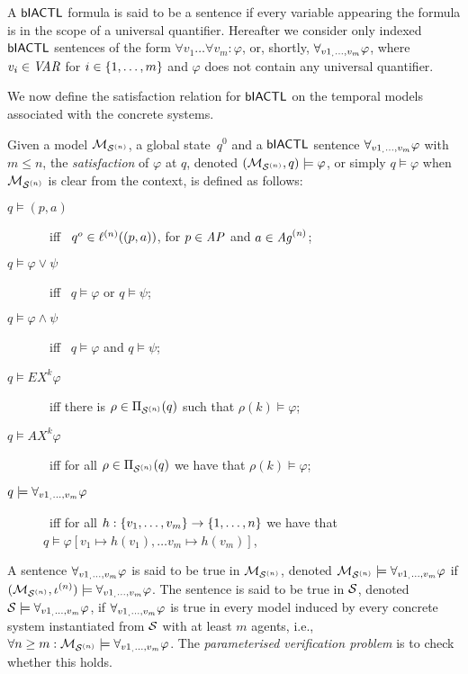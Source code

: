 A $\sf{bIACTL}$ formula is said to be a sentence if every variable appearing the
formula is in the scope of a universal quantifier. Hereafter we consider only
indexed $\sf{bIACTL}$ sentences of the form $\forall v_1 \ldots \forall v_m :
\varphi$, or, shortly, $\forall_{v1_,\ldots,v_m} \varphi$, where $v_i \in \it{VAR}$ for $i \in
\left \{ 1,\ldots,m \right \}$ and $\varphi$ does not contain any universal quantifier.

We now define the satisfaction relation for $\sf{bIACTL}$ on the temporal models
associated with the concrete systems.

\begin{definition}[Satisfaction]
  \label{def:sat} 
  Given a model $\mathcal{M}_{\mathcal{S}^{(n)}}$, a global state~$q^0$ and a $\sf{bIACTL}$ sentence
  $\forall_{v1_,\ldots,v_m} \varphi$ with $m \leq n$, the \emph{satisfaction} of $\varphi$ at $q$, denoted $(\mathcal{M}_{\mathcal{S}^{(n)}}, q)
  \models\varphi$, or simply $q \models \varphi$ when $\mathcal{M}_{\mathcal{S}^{(n)}}$ is clear from
  the context, is defined as follows:
  \begin{description}
  \item[$q \models (p, a)$] \ iff \ $q^o \in \ell^{(n)}((p, a))$, for $p \in
  \it{AP}$ and $a \in \it{Ag}^{(n)}$; 
  \item[$q \models \varphi \lor \psi$] \ iff \ $q \models \varphi$ or $q \models
  \psi$;
  \item[$q \models \varphi \land \psi$] \ iff \ $q \models \varphi$ and $q
  \models \psi$;
  \item[$q \models EX^k  \varphi$] \ iff  there is $\rho \in \Pi_{\mathcal{S}^{(n)}}(q)$ such
  that $\rho(k) \models \varphi$;
  \item[$q \models AX^k  \varphi$] \ iff for all $\rho \in \Pi_{\mathcal{S}^{(n)}}(q)$ we
  have that $\rho(k) \models \varphi$;
  \item[$q \models \forall_{v1_,\ldots,v_m} \varphi$] \ iff for all $h : \left \{ v_1, \ldots, v_m \right \}
  \rightarrow \left \{ {1}, \ldots,{n} \right \}$ we have that $q \models 
  \varphi[v_1 \mapsto h(v_1), \ldots v_m \mapsto h(v_m)]$,
 \end{description}
\end{definition}

A sentence $\forall_{v1_,\ldots,v_m} \varphi$ is said to be true in $\mathcal{M}_{\mathcal{S}^{(n)}}$, denoted $\mathcal{M}_{\mathcal{S}^{(n)}}
\models \forall_{v1_,\ldots,v_m} \varphi$ if $(\mathcal{M}_{\mathcal{S}^{(n)}}, \iota^{({n})}) \models \forall_{v1_,\ldots,v_m} \varphi$. The
sentence is said to be true in $\mathcal{S}$, denoted $\mathcal{S} \models \forall_{v1_,\ldots,v_m} \varphi$, if
$\forall_{v1_,\ldots,v_m} \varphi$ is true in every model induced by every concrete system
instantiated from $\mathcal{S}$ with at least $m$ agents, i.e., $\forall n \geq m :
\mathcal{M}_{\mathcal{S}^{(n)}} \models \forall_{v1_,\ldots,v_m} \varphi$.  The {\em parameterised verification problem} is to
check whether this holds.



